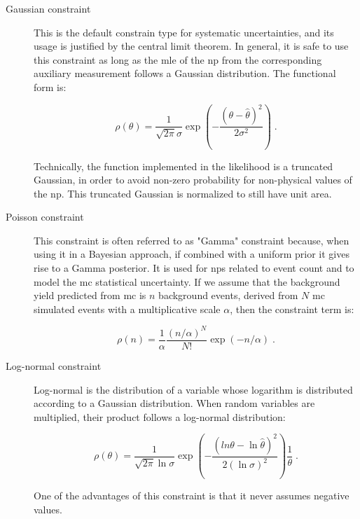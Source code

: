 \begin{description}
\item[Gaussian constraint] This is the default constrain type for systematic uncertainties, and its usage is justified by the central limit theorem. In general, it is safe to use this constraint as long as the \gls{mle} of the \gls{np} from the corresponding auxiliary measurement follows a Gaussian distribution. The functional form is:

\begin{equation}
\label{eq:stat:gauss}
\rho( \theta) = \frac{1}{\sqrt{2\pi}\sigma}\exp\left( -\frac{(\theta - \hat{\theta})^2}{2\sigma^2} \right) \; .
\end{equation}

\noindent Technically, the function implemented in the likelihood is a truncated Gaussian, in order to avoid non-zero probability for non-physical values of the \gls{np}. This truncated Gaussian is normalized to still have unit area.

\item[Poisson constraint] This constraint is often referred to as "Gamma" constraint because, when using it in a Bayesian approach, if combined with a uniform prior it gives rise to a Gamma posterior. It is used for \glspl{np} related to event count and to model the \gls{mc} statistical uncertainty. If we assume that the background yield predicted from \gls{mc} is $n$ background events, derived from $N$ \gls{mc} simulated events with a multiplicative scale $\alpha$, then the constraint term is:

\begin{equation}
\label{eq:stat:poisson}
\rho(n) = \frac{1}{\alpha} \frac{(n/\alpha)^N}{N!} \exp\left( -n/\alpha \right) \; .
\end{equation}

\item[Log-normal constraint] Log-normal is the distribution of a variable whose logarithm is distributed according to a Gaussian distribution. When random variables are multiplied, their product follows a log-normal distribution:

\begin{equation}
\label{eq:stat:lognorm}
\rho( \theta) = \frac{1}{\sqrt{2\pi}\ln{\sigma}}\exp\left( -\frac{(ln{\theta} - \ln{\hat{\theta}})^2}{2(\ln{\sigma})^2} \right)\frac{1}{\theta} \; .
\end{equation}

\noindent One of the advantages of this constraint is that it never assumes negative values.

\end{description}



